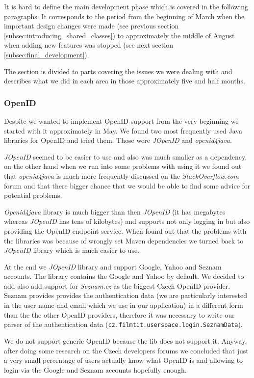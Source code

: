 It is hard to define the main development phase which is covered in the following paragraphs. It corresponds to the period from the beginning of March when the important design changes were made (see previous section \ref{subsec:introducing_shared_classes}) to approximately the middle of August when adding new features was stopped (see next section \ref{subsec:final_development}).

The section is divided to parts covering the issues we were dealing with and describes what we did in each area in those approximately five and half months.

\subsubsection{OpenID}

Despite we wanted to implement OpenID support from the very beginning we started with it approximately in May. We found two most frequently used Java libraries for OpenID and tried them. Those were \emph{JOpenID} and \emph{openid4java}.

\emph{JOpenID} seemed to be easier to use and also was much smaller as a dependency, on the other hand when we run into some problems with using it we found out that \emph{openid4java} is much more frequently discussed on the \emph{StackOverflow.com} forum and that there bigger chance that we would be able to find some advice for potential problems.

\emph{Openid4java} library is much bigger than then \emph{JOpenID} (it has megabytes whereas \emph{JOpenID} has tens of kilobytes) and supports not only logging in but also providing the OpenID endpoint service. When found out that the problems with the libraries was because of wrongly set Maven dependencies we turned back to \emph{JOpenID} library which is much easier to use.

At the end we \emph{JOpenID} library and support Google, Yahoo and Seznam accounts. The library contains the Google and Yahoo by default. We decided to add also add support for \emph{Seznam.cz} as the biggest Czech OpenID provider. Seznam provides provides the authentication data (we are particularly interested in the user name and email which we use in our application) in a different form than the the other OpenID providers, therefore it was necessary to write our parser of the authentication data ({\tt{cz.filmtit.userspace.login.SeznamData}}).

We do not support generic OpenID because the lib does not support it. Anyway, after doing some research on the Czech developers forums we concluded that just a very small percentage of users actually know what OpenID is and allowing to login via the Google and Seznam accounts hopefully enough.

